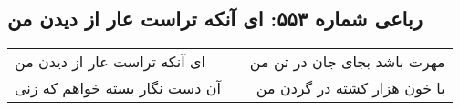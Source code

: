 \begin{center}
\section*{رباعی شماره ۵۵۳: ای آنکه تراست عار از دیدن من}
\label{sec:sh553}
\begin{longtable}{l p{0.5cm} r}
ای آنکه تراست عار از دیدن من
&&
مهرت باشد بجای جان در تن من
\\
آن دست نگار بسته خواهم که زنی
&&
با خون هزار کشته در گردن من
\\
\end{longtable}
\end{center}
